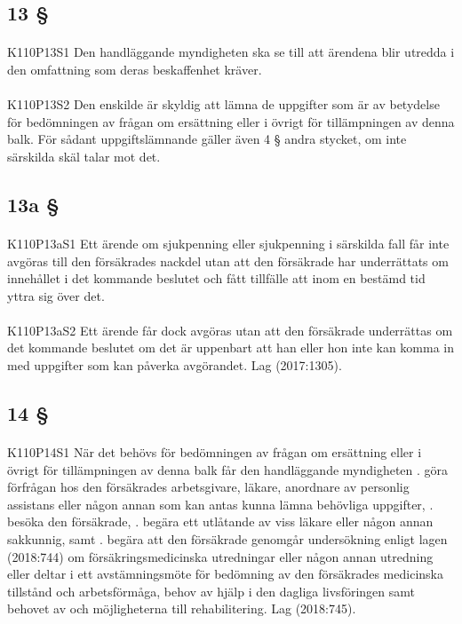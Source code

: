 \documentclass[a4paper,notitlepage,openany,10pt]{book}
\begin{document}
\subsection*{13 §}
\paragraph*{}
{\tiny K110P13S1}
Den handläggande myndigheten ska se till att ärendena blir utredda i den omfattning som deras beskaffenhet kräver.
\paragraph*{}
{\tiny K110P13S2}
Den enskilde är skyldig att lämna de uppgifter som är av betydelse för bedömningen av frågan om ersättning eller i övrigt för tillämpningen av denna balk. För sådant uppgiftslämnande gäller även 4 § andra stycket, om inte särskilda skäl talar mot det.
\subsection*{13a §}
\paragraph*{}
{\tiny K110P13aS1}
Ett ärende om sjukpenning eller sjukpenning i särskilda fall får inte avgöras till den försäkrades nackdel utan att den försäkrade har underrättats om innehållet i det kommande beslutet och fått tillfälle att inom en bestämd tid yttra sig över det.
\paragraph*{}
{\tiny K110P13aS2}
Ett ärende får dock avgöras utan att den försäkrade underrättas om det kommande beslutet om det är uppenbart att han eller hon inte kan komma in med uppgifter som kan påverka avgörandet.
Lag (2017:1305).
\subsection*{14 §}
\paragraph*{}
{\tiny K110P14S1}
När det behövs för bedömningen av frågan om ersättning eller i övrigt för tillämpningen av denna balk får den handläggande myndigheten
. göra förfrågan hos den försäkrades arbetsgivare, läkare, anordnare av personlig assistans eller någon annan som kan antas kunna lämna behövliga uppgifter,
. besöka den försäkrade,
. begära ett utlåtande av viss läkare eller någon annan sakkunnig, samt
. begära att den försäkrade genomgår undersökning enligt lagen (2018:744) om försäkringsmedicinska utredningar eller någon annan utredning eller deltar i ett avstämningsmöte för bedömning av den försäkrades medicinska tillstånd och arbetsförmåga, behov av hjälp i den dagliga livsföringen samt behovet av och möjligheterna till rehabilitering.
Lag (2018:745).
\end{document}
